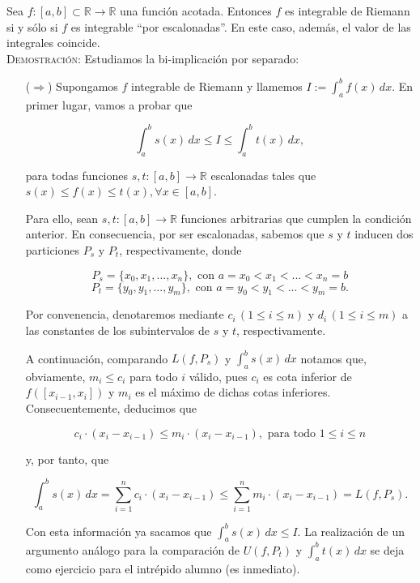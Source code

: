 \documentclass{article}
\begin{document}
Sea $f : [a, b] \subset \mathbb{R} \longrightarrow \mathbb{R}$ una función acotada. Entonces $f$ es integrable de Riemann si y sólo si $f$ es integrable ``por escalonadas''. En este caso, además, el valor de las integrales coincide. \\

\noindent\textsc{Demostración:} Estudiamos la bi-implicación por separado:

\begin{itemize}
    \item[($\Longrightarrow$)] Supongamos $f$ integrable de Riemann y llamemos $I := \int_{a}^{b} f(x) \,dx$. En primer lugar, vamos a probar que 

    \[\int_{a}^{b} s(x) \,dx \leq I \leq \int_{a}^{b} t(x) \,dx,\]

    para todas funciones $s, t : [a, b] \longrightarrow \mathbb{R}$ escalonadas tales que $s(x) \leq f(x) \leq t(x), \forall x \in [a, b]$. 
    
    
    Para ello, sean $s, t : [a, b] \longrightarrow \mathbb{R}$ funciones arbitrarias que cumplen la condición anterior. En consecuencia, por ser escalonadas, sabemos que $s$ y $t$ inducen dos particiones $P_s$ y $P_t$, respectivamente, donde

    \[P_s = \{x_0, x_1, ..., x_n\}, \text{ con } a = x_0 < x_1 < ... < x_n = b\]
    \[P_t = \{y_0, y_1, ..., y_m\}, \text{ con } a = y_0 < y_1 < ... < y_m = b.\]

    Por convenencia, denotaremos mediante $c_i \,(1 \leq i \leq n)$ y $d_i \,(1 \leq i \leq m)$ a las constantes de los subintervalos de $s$ y $t$, respectivamente. 
    
    A continuación, comparando $L(f, P_s)$ y $\int_{a}^{b} s(x) \,dx$ notamos que, obviamente, $m_i \leq c_i$ para todo $i$ válido, pues $c_i$ es cota inferior de $f([x_{i - 1}, x_i])$ y $m_i$ es el máximo de dichas cotas inferiores. Consecuentemente, deducimos que 

    \[c_i \cdot (x_i - x_{i - 1}) \leq m_i \cdot (x_i - x_{i - 1}), \text{ para todo $1 \leq i \leq n$}\]

    y, por tanto, que

    \[\int_{a}^{b} s(x) \,dx = \sum_{i = 1}^{n} c_i \cdot (x_i - x_{i - 1}) \leq \sum_{i = 1}^{n} m_i \cdot (x_i - x_{i - 1}) = L(f, P_s).\]

    Con esta información ya sacamos que $\int_{a}^{b} s(x) \,dx \leq I$. La realización de un argumento análogo para la comparación de $U(f, P_t)$ y $\int_{a}^{b} t(x) \,dx$ se deja como ejercicio para el intrépido alumno (es inmediato).


\end{itemize}
\end{document}
